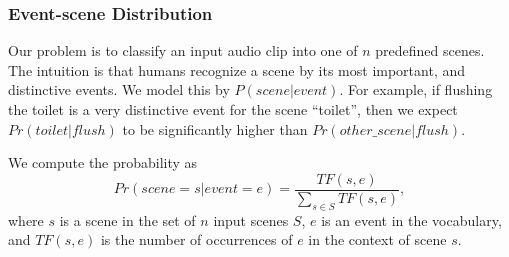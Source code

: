 \subsubsection{Event-scene Distribution}
Our problem is to classify an input audio clip into one of $n$ predefined
scenes. The intuition is that humans recognize a scene by its most important,
and distinctive events. We model this by $P(scene | event)$. For example, if
flushing the toilet is a very distinctive event for the scene ``toilet'', 
then we expect $Pr(toilet | flush)$ to be significantly higher than 
$Pr(other\_scene | flush)$.

We compute the probability as
\begin{equation}
\label{eqn:prob}
Pr(scene=s | event=e)  = \frac{TF(s, e)}{\sum_{s \in S} TF(s, e)},
\end{equation}
where $s$ is a scene in the set of $n$ input scenes $S$, 
$e$ is an event in the vocabulary, and $TF(s, e)$ is the number of occurrences
of $e$ in the context of scene $s$.


